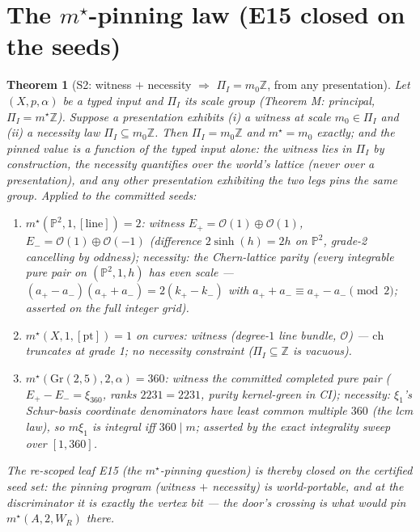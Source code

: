 \documentclass[11pt]{article}
\newtheorem{theorem}{Theorem}
\begin{document}
\section{The $m^\star$-pinning law (E15 closed on the seeds)}

\begin{theorem}[S2: witness $+$ necessity $\Rightarrow$ $\Pi_I=m_0\mathbb Z$, from any presentation]
\label{thm:s2}
Let $(X,p,\alpha)$ be a typed input and $\Pi_I$ its scale group (Theorem M:
principal, $\Pi_I=m^\star\mathbb Z$). Suppose a presentation exhibits
\emph{(i)} a witness at scale $m_0\in\Pi_I$ and \emph{(ii)} a necessity law
$\Pi_I\subseteq m_0\mathbb Z$. Then $\Pi_I=m_0\mathbb Z$ and
$m^\star=m_0$ \emph{exactly}; and the pinned value is a function of the typed
input alone: the witness lies in $\Pi_I$ by construction, the necessity
quantifies over the world's lattice (never over a presentation), and any other
presentation exhibiting the two legs pins the same group.
Applied to the committed seeds:
\begin{enumerate}
\item[\textup{(a)}] $m^\star(\mathbb P^2,1,[\mathrm{line}])=2$: witness
$E_+=\mathcal O(1)\oplus\mathcal O(1)$, $E_-=\mathcal O(1)\oplus\mathcal O(-1)$
(difference $2\sinh(h)=2h$ on $\mathbb P^2$, grade-2 cancelling by oddness);
necessity: the Chern-lattice parity (every integrable pure pair on
$(\mathbb P^2,1,h)$ has even scale --- $(a_+-a_-)(a_++a_-)=2(k_+-k_-)$ with
$a_++a_-\equiv a_+-a_-\pmod 2$; asserted on the full integer grid).
\item[\textup{(b)}] $m^\star(X,1,[\mathrm{pt}])=1$ on curves: witness
(degree-$1$ line bundle, $\mathcal O$) --- $\mathrm{ch}$ truncates at grade 1;
no necessity constraint ($\Pi_I\subseteq\mathbb Z$ is vacuous).
\item[\textup{(c)}] $m^\star(\mathrm{Gr}(2,5),2,\alpha)=360$: witness the
committed completed pure pair ($E_+-E_-=\xi_{360}$, ranks $2231=2231$, purity
kernel-green in CI); necessity: $\xi_1$'s Schur-basis coordinate denominators
have least common multiple $360$ (the lcm law), so $m\xi_1$ is integral iff
$360\mid m$; asserted by the exact integrality sweep over $[1,360]$.
\end{enumerate}
The re-scoped leaf E15 (the $m^\star$-pinning question) is thereby
\emph{closed on the certified seed set}: the pinning program
(witness $+$ necessity) is world-portable, and at the discriminator it is
exactly the vertex bit --- the door's crossing is what would pin
$m^\star(A,2,W_R)$ there.
\end{theorem}
\end{document}
